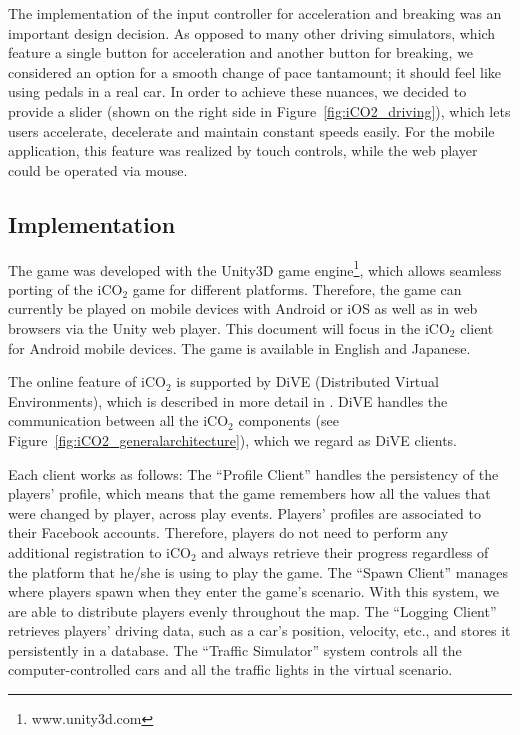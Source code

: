 \documentclass[preprint,authoryear,12pt]{elsarticle}
\begin{document}
The implementation of the input controller for acceleration and breaking was an important design decision. As opposed to many other driving simulators, which feature a single button for acceleration and another button for breaking, we considered an option for a smooth change of pace tantamount; it should feel like using pedals in a real car. In order to achieve these nuances, we decided to provide a slider (shown on the right side in Figure~\ref{fig:iCO2_driving}), which lets users accelerate, decelerate and maintain constant speeds easily. For the mobile application, this feature was realized by touch controls, while the web player could be operated via mouse.

\subsection{Implementation}


The game was developed with the Unity3D game engine\footnote{www.unity3d.com}, which allows seamless porting of the iCO$_2$ game for different platforms. Therefore, the game can currently be played on mobile devices with Android or iOS as well as in web browsers via the Unity web player. This document will focus in the iCO$_2$ client for Android mobile devices. The game is available in English and Japanese.

The online feature of iCO$_2$ is supported by DiVE (Distributed Virtual Environments), which is described in more detail in \cite{prendingeroliveira2014}. DiVE handles the communication between all the iCO$_2$ components (see Figure~\ref{fig:iCO2_generalarchitecture}), which we regard as DiVE clients.

Each client works as follows: The ``Profile Client'' handles the persistency of the players' profile, which means that the game remembers how all the values that were changed by player, across play events. Players' profiles are associated to their Facebook accounts. Therefore, players do not need to perform any additional registration to iCO$_2$ and always retrieve their progress regardless of the platform that he/she is using to play the game. The ``Spawn Client'' manages where players spawn when they enter the game's scenario. With this system, we are able to distribute players evenly throughout the map. The ``Logging Client'' retrieves players' driving data, such as a car's position, velocity, etc., and stores it persistently in a database. The ``Traffic Simulator'' system controls all the computer-controlled cars and all the traffic lights in the virtual scenario.
\end{document}
